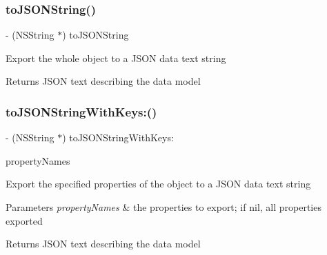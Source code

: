 \subsubsection{\texorpdfstring{to\+J\+S\+O\+N\+String()}{toJSONString()}}
{\footnotesize\ttfamily -\/ (N\+S\+String $\ast$) to\+J\+S\+O\+N\+String \begin{DoxyParamCaption}{ }\end{DoxyParamCaption}}

Export the whole object to a J\+S\+ON data text string \begin{DoxyReturn}{Returns}
J\+S\+ON text describing the data model 
\end{DoxyReturn}
\mbox{\label{interface_o_p_t_l_y_j_s_o_n_model_a7877db814d4a807b4fa309e6e4a613ce}} 
\subsubsection{\texorpdfstring{to\+J\+S\+O\+N\+String\+With\+Keys\+:()}{toJSONStringWithKeys:()}}
{\footnotesize\ttfamily -\/ (N\+S\+String $\ast$) to\+J\+S\+O\+N\+String\+With\+Keys\+: \begin{DoxyParamCaption}\item[{(N\+S\+Array $\ast$)}]{property\+Names }\end{DoxyParamCaption}}

Export the specified properties of the object to a J\+S\+ON data text string 
\begin{DoxyParams}{Parameters}
{\em property\+Names} & the properties to export; if nil, all properties exported \\
\hline
\end{DoxyParams}
\begin{DoxyReturn}{Returns}
J\+S\+ON text describing the data model 
\end{DoxyReturn}
\mbox{\label{interface_o_p_t_l_y_j_s_o_n_model_a7f6a3cd6f85c5edc5cb2629bb651b26f}} 

